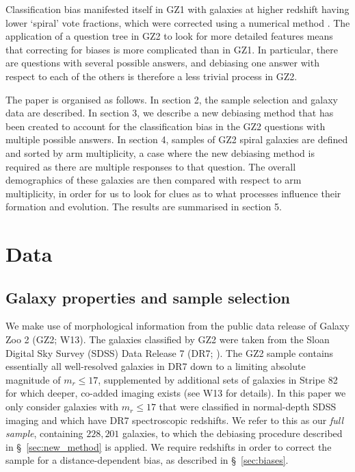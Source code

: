 \documentclass[useAMS,usenatbib]{mn2e}
\begin{document}
Classification bias manifested itself in GZ1 with galaxies at higher redshift having lower `spiral' vote fractions, which were corrected using a numerical method \citep{Bamford_09}. The application of a question tree in GZ2 to look for more detailed features means that correcting for biases is more complicated than in GZ1. In particular, there are questions with several possible answers, and debiasing one answer with respect to each of the others is therefore a less trivial process in GZ2.

The paper is organised as follows. In section 2, the sample selection and galaxy data are described. In section 3, we describe a new debiasing method that has been created to account for the classification bias in the GZ2 questions with multiple possible answers. In section 4, samples of GZ2 spiral galaxies are defined and sorted by arm multiplicity, a case where the new debiasing method is required as there are multiple responses to that question. The overall demographics of these galaxies are then compared with respect to arm multiplicity, in order for us to look for clues as to what processes influence their formation and evolution. The results are summarised in section 5.
\section{Data}
\label{sec:data}
\subsection{Galaxy properties and sample selection}
\label{sec:sample}

We make use of morphological information from the public data release of Galaxy Zoo 2 (GZ2; W13). The galaxies classified by GZ2 were taken from the Sloan Digital Sky Survey (SDSS) Data Release 7 (DR7; \citealt{Abazijian_09}). The GZ2 sample contains essentially all well-resolved galaxies in DR7 down to a limiting absolute magnitude of $m_r \leq 17$, supplemented by additional sets of galaxies in Stripe 82 for which deeper, co-added imaging exists (see W13 for details).  In this paper we only consider galaxies with $m_r \leq 17$ that were classified in normal-depth SDSS imaging and which have DR7 spectroscopic redshifts. We refer to this as our \textit{full sample}, containing $228,201$ galaxies, to which the debiasing procedure described in \S~\ref{sec:new_method} is applied. We require redshifts in order to correct the sample for a distance-dependent bias, as described in \S~\ref{sec:biases}.
\end{document}
